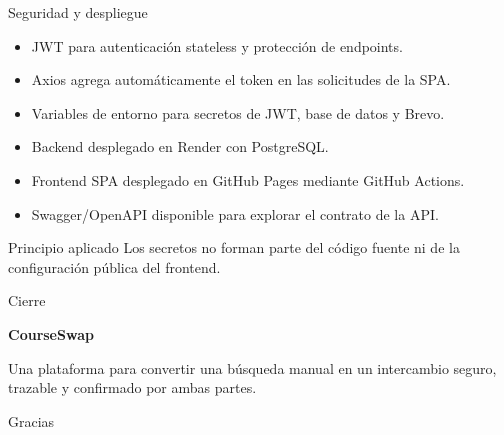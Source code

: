 \documentclass[aspectratio=169,11pt]{beamer}
\begin{document}
\begin{frame}{Seguridad y despliegue}
  \begin{itemize}
    \item JWT para autenticación stateless y protección de endpoints.
    \item Axios agrega automáticamente el token en las solicitudes de la SPA.
    \item Variables de entorno para secretos de JWT, base de datos y Brevo.
    \item Backend desplegado en Render con PostgreSQL.
    \item Frontend SPA desplegado en GitHub Pages mediante GitHub Actions.
    \item Swagger/OpenAPI disponible para explorar el contrato de la API.
  \end{itemize}
  \vspace{0.25cm}
  \begin{block}{Principio aplicado}
    Los secretos no forman parte del código fuente ni de la configuración
    pública del frontend.
  \end{block}
\end{frame}

\begin{frame}{Cierre}
  \begin{center}
    {\Huge\color{coursegreen}\textbf{CourseSwap}}
    
    \vspace{0.4cm}
    {\large Una plataforma para convertir una búsqueda manual en un intercambio
    seguro, trazable y confirmado por ambas partes.}
    
    \vspace{0.7cm}
    \textcolor{coursegreenmid}{Gracias}
  \end{center}
\end{frame}
\end{document}
